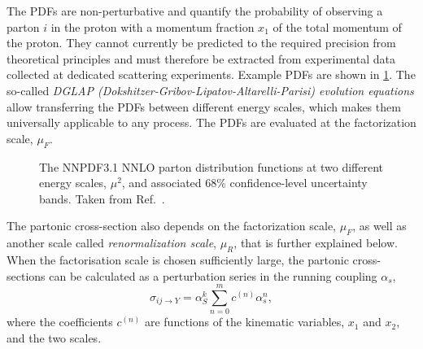 The PDFs are non-perturbative and quantify the probability of observing a parton $i$ in the proton with a momentum fraction $x_1$ of the total momentum of the proton.
They cannot currently be predicted to the required precision from theoretical principles and must therefore be extracted from experimental data collected at dedicated scattering experiments.
Example PDFs are shown in \cref{fig:pdfs}.
The so-called \emph{DGLAP (Dokshitzer-Gribov-Lipatov-Altarelli-Parisi) evolution equations} \cite{Dokshitzer:1977sg,GRIBOV197178,Altarelli:1977zs} allow transferring the PDFs between different energy scales, which makes them universally applicable to any process. The PDFs are evaluated at the factorization scale, $\mu_F$. 

\begin{figure}
  \caption[The NNPDF3.1 NNLO parton distribution functions at two different energy scales, $\mu^2$, and associated 68\% confidence-level uncertainty bands.]{The NNPDF3.1 NNLO parton distribution functions at two different energy scales, $\mu^2$, and associated 68\% confidence-level uncertainty bands. Taken from Ref.~\cite{2017NNPDF}.}
  \label{fig:pdfs}
\end{figure}

The partonic cross-section also depends on the factorization scale, $\mu_F$, as well as another scale called \emph{renormalization scale}, $\mu_R$, that is further explained below.
When the factorisation scale is chosen sufficiently large, the partonic cross-sections can be calculated as a perturbation series in the running coupling $\alpha_s$,
\begin{equation}
  \hat{\sigma}_{ij \rightarrow Y} = \alpha^k_S \sum_{n=0}^{m} c^{(n)}\alpha_s^n,
  \label{eq:alphaexp}
\end{equation}
where the coefficients $c^{(n)}$ are functions of the kinematic variables, $x_1$ and $x_2$, and the two scales. 

